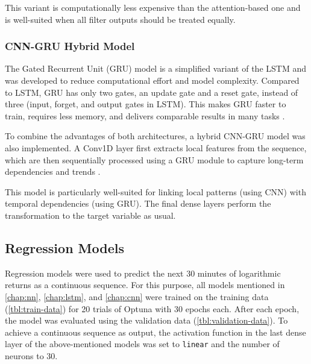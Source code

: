 This variant is computationally less expensive than the attention-based one and is well-suited when all filter outputs should be treated equally.



\subsubsection{CNN-GRU Hybrid Model}

The Gated Recurrent Unit (GRU) model is a simplified variant of the LSTM and was developed to reduce computational effort and model complexity.
Compared to LSTM, GRU has only two gates, an update gate and a reset gate, instead of three (input, forget, and output gates in LSTM).
This makes GRU faster to train, requires less memory, and delivers comparable results in many tasks \cite{gru-basics}.

To combine the advantages of both architectures, a hybrid CNN-GRU model was also implemented.
A Conv1D layer first extracts local features from the sequence, which are then sequentially processed using a GRU module to capture long-term dependencies and trends \cite{cnn-gru}.

This model is particularly well-suited for linking local patterns (using CNN) with temporal dependencies (using GRU).
The final dense layers perform the transformation to the target variable as usual.



\subsection{Regression Models}
\label{chap:regression-models}

Regression models were used to predict the next 30 minutes of logarithmic returns as a continuous sequence.
For this purpose, all models mentioned in \autoref{chap:nn}, \autoref{chap:lstm}, and \autoref{chap:cnn} were trained on the training data (\autoref{tbl:train-data}) for 20 trials of Optuna with 30 epochs each.
After each epoch, the model was evaluated using the validation data (\autoref{tbl:validation-data}).
To achieve a continuous sequence as output, the activation function in the last dense layer of the above-mentioned models was set to \verb|linear| and the number of neurons to 30.

